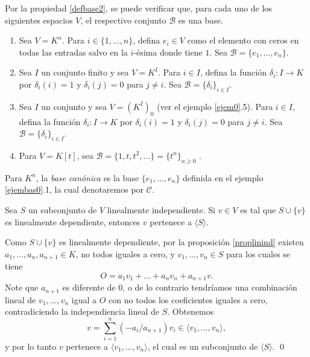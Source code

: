 \begin{ejem}\label{ejembas0}
Por la propiedad \ref{defbase2}, se puede verificar que, para cada uno de los siguientes espacios $V$, el respectivo conjunto $\mathcal{B}$ es una base.
\begin{enumerate}
\item Sea $V=K^n$. Para $i\in\{1,\ldots, n\}$, defina $e_i\in V$ como el elemento con ceros en todas las entradas salvo en la $i$-\'esima donde tiene $1$. Sea $\mathcal{B}=\{e_1,\ldots,e_n\}$.
\item  Sea $I$ un conjunto finito y sea $V=K^I$. Para $i\in I$, defina la funci\'on $\delta_i: I\rightarrow K$ por $\delta_i(i)=1$ y $\delta_i(j)=0$ para $j\ne i$. Sea $\mathcal{B}=\{\delta_i\}_{i\in I}$. 
\item Sea $I$ un conjunto y sea $V=\left(K^I\right)_0$ (ver el ejemplo \ref{ejem0}.5). Para $i\in I$, defina la funci\'on $\delta_i: I\rightarrow K$ por $\delta_i(i)=1$ y $\delta_i(j)=0$ para $j\ne i$. Sea $\mathcal{B}=\{\delta_i\}_{i\in I}$. 
\item Para $V=K[t]$, sea $\mathcal{B}=\{1,t,t^2,\ldots\}=\{t^n\}_{n\ge 0}$ .
\end{enumerate}
\end{ejem}

\begin{defn}
Para $K^n$, la \emph{base can\'onica} es la base $\{e_1,\ldots,e_n\}$ definida en el ejemplo \ref{ejembas0}.1, la cual denotaremos por $\mathcal{C}$.
\end{defn}

\begin{lema}\label{inddep}
Sea $S$ un subconjunto de $V$ linealmente independiente. Si $v\in V$ es tal que $S\cup\{v\}$ es linealmente dependiente, entonces $v$ pertenece a $\langle S\rangle$.
\end{lema}

\dem Como $S\cup\{v\}$ es linealmente dependiente, por la proposici\'on \ref{proplinind} existen $a_1,\ldots,a_n,a_{n+1}\in K$, no todos iguales a cero, y $v_1,\ldots,v_n\in S$ para los cuales se tiene
\[
O=a_1v_1+\ldots+a_nv_n+a_{n+1}v.
\]
Note que $a_{n+1}$ es diferente de $0$, o de lo contrario tendr\'iamos una combinaci\'on lineal de $v_1,\ldots,v_n$ igual a $O$ con no todos los coeficientes iguales a cero, contradiciendo la independiencia lineal de $S$. Obtenemos
\[
v=\sum_{i=1}^n(-a_i/a_{n+1})v_i\in\langle v_1,\ldots,v_n\rangle,
\]
y por lo tanto $v$ pertenece a $\langle v_1,\ldots,v_n\rangle$, el cual es un subconjunto de $\langle S\rangle$. \qed

